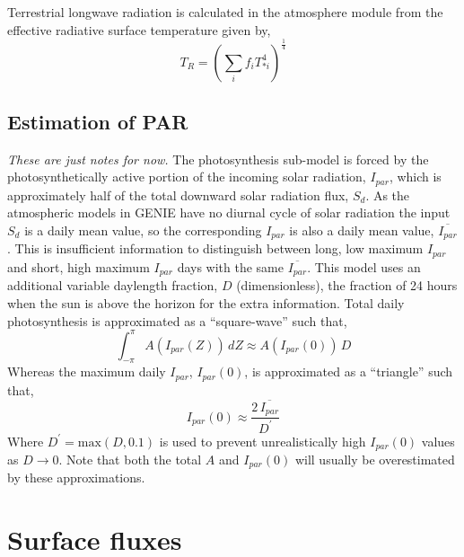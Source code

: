 \documentclass[a4paper]{article}
\begin{document}
Terrestrial longwave radiation is calculated in the atmosphere module
from the effective radiative surface temperature given by,
\begin{equation}
  T_R = \left(\sum_i f_i T_{*i}^4 \right)^{\frac{1}{4}} \label{e:tr}
\end{equation}

\subsection*{Estimation of PAR}
{\em These are just notes for now.}  The photosynthesis sub-model is
forced by the photosynthetically active portion of the incoming solar
radiation, $I_{par}$, which is approximately half of the total
downward solar radiation flux, $S_d$.  As the atmospheric models in
GENIE have no diurnal cycle of solar radiation the input $S_d$ is a
daily mean value, so the corresponding $I_{par}$ is also a daily mean
value, $\overline{I_{par}}$.  This is insufficient information to
distinguish between long, low maximum $I_{par}$ and short, high
maximum $I_{par}$ days with the same $\overline{I_{par}}$.  This model
uses an additional variable daylength fraction, $D$ (dimensionless),
the fraction of 24 hours when the sun is above the horizon for the
extra information.  Total daily photosynthesis is approximated as a
``square-wave'' such that,
\begin{equation}
  \int_{-\pi}^{\pi} A(I_{par}(Z)) \, dZ \approx A(I_{par}(0)) \, D
\end{equation}
Whereas the maximum daily $I_{par}$, $I_{par}(0)$, is approximated as
a ``triangle'' such that,
\begin{equation}
  I_{par}(0) \approx \frac{2 \, \overline{I_{par}}}{D^{\prime}}
\end{equation}
Where $D^{\prime} = \mbox{max}(D, 0.1)$ is used to prevent
unrealistically high $I_{par}(0)$ values as $D \rightarrow 0$.  Note
that both the total $A$ and $I_{par}(0)$ will usually be overestimated
by these approximations.

\section{Surface fluxes}\label{s:surf}
\end{document}
